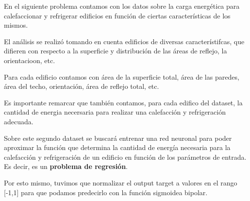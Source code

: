En el siguiente problema contamos con los datos sobre la carga energética para calefaccionar y refrigerar edificios en función de ciertas características de los mismos.

El análisis se realizó tomando en cuenta edificios de diversas característifcas, que difieren con respecto a la superficie y distribución de las áreas de reflejo, la orientacioon, etc.

Para cada edificio contamos con área de la superficie total, área de las paredes, área del techo, orientación, área de reflejo total, etc.

Es importante remarcar que también contamos, para cada edifico del dataset, la cantidad de energia necersaria para realizar una calefacción y refrigeración adecuada.

Sobre este segundo dataset se buscará entrenar una red neuronal para poder aproximar la función que determina la cantidad de energía necesaria para la calefacción y refrigeración de un edificio en función de los parámetros de entrada. Es decir, es un \textbf{problema de regresión}.

Por esto mismo, tuvimos que normalizar el output target a valores en el rango [-1,1] para que podamos predecirlo con la función sigmoidea bipolar.
